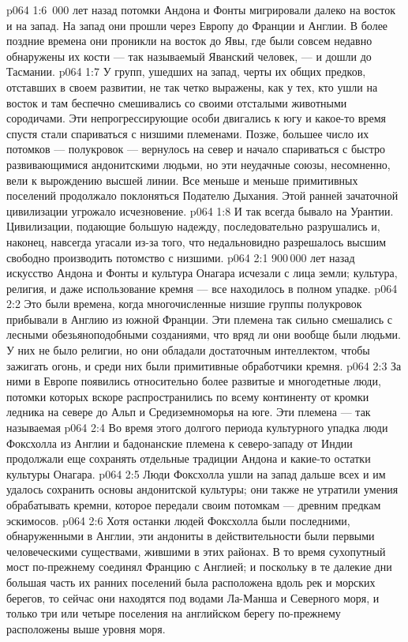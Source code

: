 \vs p064 1:6 \,000 лет назад потомки Андона и Фонты мигрировали далеко на восток и на запад. На запад они прошли через Европу до Франции и Англии. В более поздние времена они проникли на восток до Явы, где были совсем недавно обнаружены их кости --- так называемый Яванский человек, --- и дошли до Тасмании.
\vs p064 1:7 У групп, ушедших на запад, черты их общих предков, отставших в своем развитии, не так четко выражены, как у тех, кто ушли на восток и там беспечно смешивались со своими отсталыми животными сородичами. Эти непрогрессирующие особи двигались к югу и какое\hyp{}то время спустя стали спариваться с низшими племенами. Позже, большее число их потомков --- полукровок --- вернулось на север и начало спариваться с быстро развивающимися андонитскими людьми, но эти неудачные союзы, несомненно, вели к вырождению высшей линии. Все меньше и меньше примитивных поселений продолжало поклоняться Подателю Дыхания. Этой ранней зачаточной цивилизации угрожало исчезновение.
\vs p064 1:8 И так всегда бывало на Урантии. Цивилизации, подающие большую надежду, последовательно разрушались и, наконец, навсегда угасали из\hyp{}за того, что недальновидно разрешалось высшим свободно производить потомство с низшими.
\vs p064 2:1 900\,000 лет назад искусство Андона и Фонты и культура Онагара исчезали с лица земли; культура, религия, и даже использование кремня --- все находилось в полном упадке.
\vs p064 2:2 Это были времена, когда многочисленные низшие группы полукровок прибывали в Англию из южной Франции. Эти племена так сильно смешались с лесными обезьяноподобными созданиями, что вряд ли они вообще были людьми. У них не было религии, но они обладали достаточным интеллектом, чтобы зажигать огонь, и среди них были примитивные обработчики кремня.
\vs p064 2:3 За ними в Европе появились относительно более развитые и многодетные люди, потомки которых вскоре распространились по всему континенту от кромки ледника на севере до Альп и Средиземноморья на юге. Эти племена --- так называемая 
\vs p064 2:4 Во время этого долгого периода культурного упадка люди Фоксхолла из Англии и бадонанские племена к северо\hyp{}западу от Индии продолжали еще сохранять отдельные традиции Андона и какие\hyp{}то остатки культуры Онагара.
\vs p064 2:5 \pc Люди Фоксхолла ушли на запад дальше всех и им удалось сохранить основы андонитской культуры; они также не утратили умения обрабатывать кремни, которое передали своим потомкам --- древним предкам эскимосов.
\vs p064 2:6 Хотя останки людей Фоксхолла были последними, обнаруженными в Англии, эти андониты в действительности были первыми человеческими существами, жившими в этих районах. В то время сухопутный мост по\hyp{}прежнему соединял Францию с Англией; и поскольку в те далекие дни большая часть их ранних поселений была расположена вдоль рек и морских берегов, то сейчас они находятся под водами Ла\hyp{}Манша и Северного моря, и только три или четыре поселения на английском берегу по\hyp{}прежнему расположены выше уровня моря.
